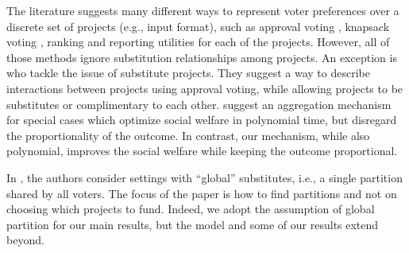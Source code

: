 \documentclass[runningheads]{llncs}
\newcommand{\kibitz}[2]{\ifnum\Comments=1{\color{#1}{#2}}\fi}
\newcommand{\rmr}[1]{\kibitz{red}{[Reshef says:#1]}}
\newcommand{\rf}[1]{\kibitz{blue}{[Roy says:#1]}}
\begin{document}
The literature suggests many different ways to 
represent voter preferences over a discrete set of projects (e.g., input format), such as approval voting \cite{aziz2021participatory, aziz2017proportionally}, knapsack voting \cite{goel2019knapsack}, 
ranking \cite{benade2020preference}
and reporting utilities \cite{peters2020proportional} for each of the projects. However, all of those methods ignore substitution relationships  among projects. %
An exception is \citet{jain2020participatory, jain2021partition} who tackle the issue of substitute projects. They suggest a way to describe  interactions between projects using approval voting, while allowing 
projects to be  substitutes  or complimentary to each other. 
\citet{jain2020participatory}  suggest an aggregation mechanism for special cases which  optimize social welfare in polynomial time, but disregard    the proportionality of the outcome. In contrast, our mechanism, while 
also polynomial,    improves the social welfare while keeping the outcome proportional. 

 In \citep{jain2021partition}, the authors consider settings with  ``global''  substitutes, i.e., a single partition  shared by all voters. The focus of the  paper  is how to find  partitions and not on choosing which projects to fund.
 Indeed, we adopt the assumption of global partition for our main results, but the model and some of our results extend beyond.
 
 
\end{document}
